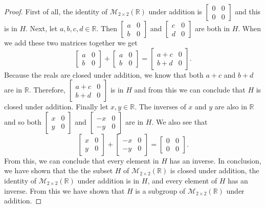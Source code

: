 \documentclass[11pt,a4paper]{article}
\begin{document}
\begin{proof}
First of all, the identity of $\mathcal{M}_{2\times 2}(\mathbb{R})$ under addition is $\begin{bmatrix}
0&0\\
0&0
\end{bmatrix}$ and this is in $H$. Next, let $a,b,c,d\in\mathbb{R}$. Then $\begin{bmatrix}
a&0\\
b&0
\end{bmatrix}$
and $\begin{bmatrix}
c&0\\
d&0
\end{bmatrix}$ are both in $H$. When we add these two matrices together we get
\[\begin{bmatrix}
a&0\\
b&0
\end{bmatrix} + 
\begin{bmatrix}
a&0\\
b&0
\end{bmatrix} =
\begin{bmatrix}
a+c&0\\
b+d&0
\end{bmatrix}.
\]
Because the reals are closed under addition, we know that both $a+c$ and $b+d$ are in $\mathbb{R}$. Therefore, $\begin{bmatrix}
a+c&0\\
b+d&0
\end{bmatrix}$ is in $H$ and from this we can conclude that $H$ is closed under addition. Finally let $x,y\in\mathbb{R}$. The inverses of $x$ and $y$ are also in $\mathbb{R}$ and so both
$\begin{bmatrix}x&0\\y&0\end{bmatrix}$ and $\begin{bmatrix}-x&0\\-y&0\end{bmatrix}$ are in $H$. We also see that
\[\begin{bmatrix}x&0\\y&0\end{bmatrix}+\begin{bmatrix}-x&0\\-y&0\end{bmatrix}=\begin{bmatrix}0&0\\0&0\end{bmatrix}.\] From this, we can conclude that every element in $H$ has an inverse. In conclusion, we have shown that the the subset $H$ of $\mathcal{M}_{2\times 2}(\mathbb{R})$ is closed under addition, the identity of $\mathcal{M}_{2\times 2}(\mathbb{R})$ under addition is in $H$, and every element of $H$ has an inverse. From this we have shown that $H$ is a subgroup of $\mathcal{M}_{2\times 2}(\mathbb{R})$ under addition.
\end{proof}
\end{document}
